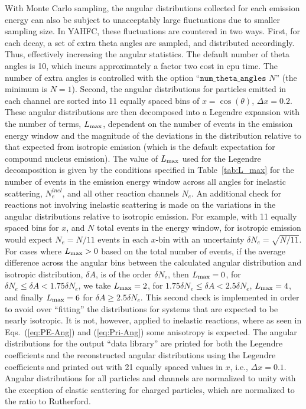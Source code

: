 \documentclass[
10pt,
showpacs,preprintnumbers,footinbib,
amsfonts,amsmath,amssymb,
aps,
prc,twocolumn,groupedaddress,superscriptaddress,
showkeys,
nofootinbib
]{revtex4-1}
\begin{document}
With Monte Carlo sampling, the angular distributions collected for each emission energy can also be subject to unacceptably large fluctuations due to smaller sampling size. In YAHFC, these fluctuations are countered in two ways. First, for each decay, a set of extra theta angles are sampled, and distributed accordingly. Thus, effectively increasing the angular statistics. The default number of theta angles is 10, which incurs approximately a factor two cost in cpu time. The number of extra angles is controlled with the option ``${\texttt{num\_theta\_angles }} N$'' (the minimum is $N = 1$). 
Second, the angular distributions for particles emitted in each channel are sorted into 11 equally spaced bins of $x=\cos(\theta)$, $\Delta x = 0.2$. These angular distributions are then decomposed into a Legendre expansion with the number of terms, $L_{\rm max}$, dependent on the number of events in the emission energy window and the magnitude of the deviations in the distribution relative to that expected from isotropic emission (which is the default expectation for compound nucleus emission). The value of $L_{\rm max}$ used for the Legendre decomposition is given by the conditions specified in Table~\ref{tab:L_max} for the number of events in the emission energy window across all angles for inelastic scattering, $N_e^{inel}$, and all other reaction channels $N_e$. An additional check for reactions not involving inelastic scattering is made on the variations in the angular distributions relative to isotropic emission. For example, with 11 equally spaced bins for $x$, and $N$ total events in the energy window, for isotropic emission would expect $N_e=N/11$ events in each $x$-bin with an uncertainty $\delta N_e = \sqrt{N/11}$. For cases where $L_{\rm max} > 0$ based on the total number of events, if the average difference across the angular bins between the calculated angular distribution and isotropic distribution, $\delta A$, is of the order $\delta N_e$, then $L_{\rm max} = 0$, for $\delta N_e \le \delta A < 1.75 \delta N_e$, we take $L_{\rm max} = 2$, for $1.75\delta N_e \le \delta A < 2.5 \delta N_e$, $L_{\rm max} = 4$, and finally $L_{\rm max} = 6$ for $ \delta A \ge 2.5 \delta N_e$. This second check is implemented in order to avoid over ``fitting'' the distributions for systems that are expected to be nearly isotropic. It is not, however, applied to inelastic reactions, where as seen in Eqs.~(\ref{eq:PE-Ang}) and (\ref{eq:Pri-Ang}) some anisotropy is expected.  The angular distributions for the output ``data library'' are printed for both the Legendre coefficients and the reconstructed angular distributions using the Legendre coefficients and printed out with 21 equally spaced values in $x$, i.e., $\Delta x = 0.1$. Angular distributions for all particles and channels are normalized to unity with the exception of elastic scattering for charged particles, which are normalized to the ratio to Rutherford. 
\end{document}
